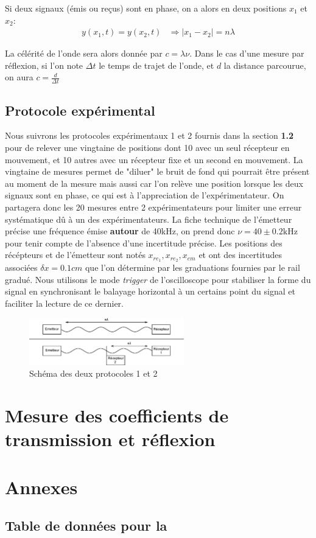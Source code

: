 \documentclass[12pt]{article}
\begin{document}
Si deux signaux (émis ou reçus) sont en phase, on a alors en deux positions $x_1$ et $x_2$:
\begin{align*}
	y(x_1, t) = y(x_2, t) & \Rightarrow |x_1 - x_2| = n\lambda
\end{align*}

La célérité de l'onde sera alors donnée par $c = \lambda \nu$. Dans le cas d'une mesure par réflexion, si l'on note $\Delta t$ le temps de trajet de l'onde, et $d$ la distance parcourue, on aura $c = \frac{d}{\Delta t}$

\subsection{Protocole expérimental}
Nous suivrons les protocoles expérimentaux 1 et 2 fournis dans la section \textbf{1.2} pour de relever une vingtaine de positions dont 10 avec un seul récepteur en mouvement, et 10 autres
avec un récepteur fixe et un second en mouvement. La vingtaine de mesures permet de "diluer" le bruit de fond qui pourrait être présent au moment de la mesure mais aussi car l'on relève une position
lorsque les deux signaux sont en phase, ce qui est à l'appreciation de l'expérimentateur. On partagera donc les 20 mesures entre 2 expérimentateurs pour limiter une erreur systématique dû à un des expérimentateurs. 
La fiche technique de l'émetteur précise une fréquence émise \textbf{autour} de 40kHz, on prend donc $\nu = 40 \pm 0.2 \text{kHz}$ pour tenir compte de l'absence d'une incertitude précise. 
Les positions des récépteurs et de l'émetteur sont notés $x_{re_1}, x_{re_2}, x_{em}$ et ont des incertitudes associées
$\delta x = 0.1cm$ que l'on détermine par les graduations fournies par le rail gradué. 
Nous utilisons le mode \textit{trigger}
de l'oscilloscope pour stabiliser la forme du signal en synchronisant le balayage horizontal à un certains point du signal et faciliter la lecture de ce dernier.
\begin{figure}[!htbp]
	\centering
	\includegraphics[width=0.6\textwidth]{img/schema}
	\hfill
	\caption{Schéma des deux protocoles 1 et 2}
\end{figure}

\break
\section{Mesure des coefficients de transmission et réflexion}


\break
\section*{Annexes}
\subsection*{Table de données pour la }
\end{document}
